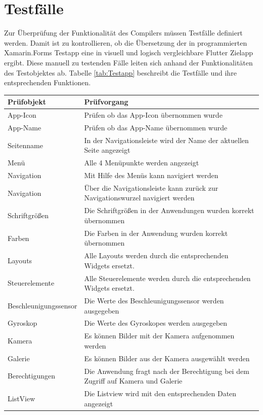 \section{Testfälle}
Zur Überprüfung der Funktionalität des Compilers müssen Testfälle definiert werden. Damit ist zu 
kontrollieren, ob die Übersetzung der in \Csharp{} programmierten  Xamarin.Forms Testapp eine in 
visuell und logisch vergleichbare Flutter Zielapp ergibt.  Diese manuell zu testenden Fälle leiten sich anhand der Funktionalitäten des Testobjektes ab.  Tabelle \ref{tab:Testapp} beschreibt die Testfälle und ihre entsprechenden Funktionen.

\newpage
\begin{xltabular}{\textwidth}{|l|X|}
\hline
   \textbf{Prüfobjekt} & \textbf{Prüfvorgang}  \\  
\hline
App-Icon	           					& Prüfen ob das App-Icon übernommen wurde                      			 		\\ 
App-Name          					& Prüfen ob das App-Name übernommen wurde                      		 \\ 
Seitenname  	         				& In der Navigationsleiste wird der Name der aktuellen Seite angezeigt               \\ 
Menü         			  				& Alle 4 Menüpunkte werden angezeigt                     			 \\ 
Navigation         			  		& Mit Hilfe des Menüs kann navigiert werden                      			 \\ 
Navigation          					& Über die Navigationsleiste kann zurück zur Navigationswurzel navigiert werden                      			 \\ 
Schriftgrößen			         	& Die Schriftgrößen in der Anwendungen wurden korrekt übernommen                 			 \\ 
Farben						         	& Die Farben in der Anwendung wurden korrekt übernommen                 			 \\ 
Layouts 								& Alle Layouts werden durch die entsprechenden Widgets ersetzt.                 			 \\ 
Steuerelemente						& Alle Steuerelemente werden durch die entsprechenden Widgets ersetzt.                 			 \\ 
Beschleunigungssensor        	& Die Werte des Beschleunigungssensor werden ausgegeben          			 \\ 
Gy­ro­s­kop						         & Die Werte des Gyroskopes werden ausgegeben                            			 \\ 
Kamera			         				& Es können Bilder mit der Kamera aufgenommen werden                			 \\ 
Galerie			         				& Es können Bilder aus der Kamera ausgewählt werden                			 \\ 
Berechtigungen			         	& Die Anwendung fragt nach der Berechtigung bei dem Zugriff auf Kamera und Galerie                   			 \\ 
ListView					         	& Die Listview wird mit den entsprechenden Daten angezeigt                   			 \\ 
\hline


\end{xltabular}
